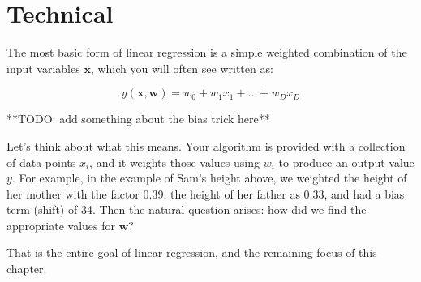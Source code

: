 \section{Technical}
The most basic form of linear regression is a simple weighted combination of the input variables $\textbf{x}$, which you will often see written as:

\begin{equation}
    y(\textbf{x}, \textbf{w}) = w_{0} + w_{1}x_{1} + ... + w_{D}x_{D}
\end{equation}

**TODO: add something about the bias trick here**

Let's think about what this means. Your algorithm is provided with a collection of data points $x_{i}$, and it weights those values using $w_i$ to produce an output value $y$. For example, in the example of Sam's height above, we weighted the height of her mother with the factor 0.39, the height of her father as 0.33, and had a bias term (shift) of 34. Then the natural question arises: how did we find the appropriate values for $\textbf{w}$?

That is the entire goal of linear regression, and the remaining focus of this chapter.